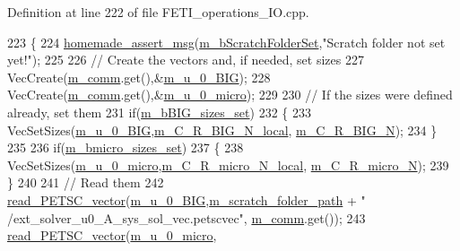 Definition at line 222 of file F\+E\+T\+I\+\_\+operations\+\_\+\+I\+O.\+cpp.


\begin{DoxyCode}
223 \{
224     \hyperlink{common__header_8h_a593ccc80b790b2268653fcf6597bf451}{homemade\_assert\_msg}(\hyperlink{classcarl_1_1_f_e_t_i___operations_a8bb9de7de35a2f7d7d5982ae1085ba15}{m\_bScratchFolderSet},\textcolor{stringliteral}{"Scratch folder not set
       yet!"});
225 
226     \textcolor{comment}{// Create the vectors and, if needed, set sizes}
227     VecCreate(\hyperlink{classcarl_1_1_f_e_t_i___operations_a8cb0ed286667fc9f3ebc2d8ef2a3e13b}{m\_comm}.get(),&\hyperlink{classcarl_1_1_f_e_t_i___operations_ad8097151d30d2d9b8acd6bc67caffcf4}{m\_u\_0\_BIG});
228     VecCreate(\hyperlink{classcarl_1_1_f_e_t_i___operations_a8cb0ed286667fc9f3ebc2d8ef2a3e13b}{m\_comm}.get(),&\hyperlink{classcarl_1_1_f_e_t_i___operations_a24aa345060f6ae75b71ce2071aa3a093}{m\_u\_0\_micro});
229 
230     \textcolor{comment}{// If the sizes were defined already, set them}
231     \textcolor{keywordflow}{if}(\hyperlink{classcarl_1_1_f_e_t_i___operations_a03d5022fa7da0e04b60c59c3d3cd598a}{m\_bBIG\_sizes\_set})
232     \{
233         VecSetSizes(\hyperlink{classcarl_1_1_f_e_t_i___operations_ad8097151d30d2d9b8acd6bc67caffcf4}{m\_u\_0\_BIG},\hyperlink{classcarl_1_1_f_e_t_i___operations_a87856fb17203f71c386d800b1021e483}{m\_C\_R\_BIG\_N\_local},
      \hyperlink{classcarl_1_1_f_e_t_i___operations_a70409f475e309e5fbcea9be931aa321b}{m\_C\_R\_BIG\_N});
234     \}
235     
236     \textcolor{keywordflow}{if}(\hyperlink{classcarl_1_1_f_e_t_i___operations_aa3daef2d7401e0988cdea89f7ae31869}{m\_bmicro\_sizes\_set})
237     \{
238         VecSetSizes(\hyperlink{classcarl_1_1_f_e_t_i___operations_a24aa345060f6ae75b71ce2071aa3a093}{m\_u\_0\_micro},\hyperlink{classcarl_1_1_f_e_t_i___operations_a6c67394d9e538b1280b7059ff0258577}{m\_C\_R\_micro\_N\_local},
      \hyperlink{classcarl_1_1_f_e_t_i___operations_a067cab6ead10411079ae05a812c35d53}{m\_C\_R\_micro\_N});
239     \}
240     
241     \textcolor{comment}{// Read them}
242     \hyperlink{namespacecarl_a4d0e2c60b0765dc8182c95362c5d329a}{read\_PETSC\_vector}(\hyperlink{classcarl_1_1_f_e_t_i___operations_ad8097151d30d2d9b8acd6bc67caffcf4}{m\_u\_0\_BIG},\hyperlink{classcarl_1_1_f_e_t_i___operations_ad6d35bc9b5221d45452fbc8931f22055}{m\_scratch\_folder\_path} + \textcolor{stringliteral}{"
      /ext\_solver\_u0\_A\_sys\_sol\_vec.petscvec"}, \hyperlink{classcarl_1_1_f_e_t_i___operations_a8cb0ed286667fc9f3ebc2d8ef2a3e13b}{m\_comm}.get());
243     \hyperlink{namespacecarl_a4d0e2c60b0765dc8182c95362c5d329a}{read\_PETSC\_vector}(\hyperlink{classcarl_1_1_f_e_t_i___operations_a24aa345060f6ae75b71ce2071aa3a093}{m\_u\_0\_micro},

\end{DoxyCode}
